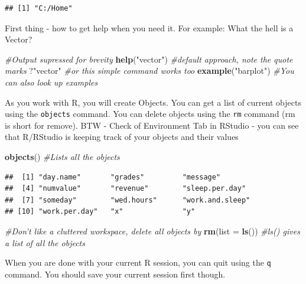 \documentclass[]{krantz}
\makeatletter
\newenvironment{Shaded}{\begin{snugshade}}{\end{snugshade}}
\newcommand{\KeywordTok}[1]{\textcolor[rgb]{0.27,0.27,0.27}{\textbf{#1}}}
\newcommand{\DataTypeTok}[1]{\textcolor[rgb]{0.27,0.27,0.27}{#1}}
\newcommand{\StringTok}[1]{\textcolor[rgb]{0.5,0.5,0.5}{#1}}
\newcommand{\CommentTok}[1]{\textcolor[rgb]{0.37,0.37,0.37}{\textit{#1}}}
\newcommand{\NormalTok}[1]{#1}
\newenvironment{kframe}{%
\medskip{}
\setlength{\fboxsep}{.8em}
 \def\at@end@of@kframe{}%
 \ifinner\ifhmode%
  \def\at@end@of@kframe{\end{minipage}}%
  \begin{minipage}{\columnwidth}%
 \fi\fi%
 \def\FrameCommand##1{\hskip\@totalleftmargin \hskip-\fboxsep
 \colorbox{shadecolor}{##1}\hskip-\fboxsep
     \hskip-\linewidth \hskip-\@totalleftmargin \hskip\columnwidth}%
 \MakeFramed {\advance\hsize-\width
   \@totalleftmargin\z@ \linewidth\hsize
   \@setminipage}}%
 {\par\unskip\endMakeFramed%
 \at@end@of@kframe}
\renewenvironment{Shaded}{\begin{kframe}}{\end{kframe}}
\makeatother
\begin{document}
\begin{verbatim}
## [1] "C:/Home"
\end{verbatim}

First thing - how to get help when you need it. For example: What the
hell is a Vector?

\begin{Shaded}
\begin{Highlighting}[]
\CommentTok{#Output supressed for brevity}
\KeywordTok{help}\NormalTok{(}\StringTok{"vector"}\NormalTok{) }\CommentTok{#default approach, note the quote marks}
\NormalTok{?}\StringTok{"vector"} \CommentTok{#or this simple command works too}
\KeywordTok{example}\NormalTok{(}\StringTok{"barplot"}\NormalTok{) }\CommentTok{#You can also look up examples}
\end{Highlighting}
\end{Shaded}

As you work with R, you will create Objects. You can get a list of
current objects using the \texttt{objects} command. You can delete
objects using the \texttt{rm} command (rm is short for remove). BTW -
Check of Environment Tab in RStudio - you can see that R/RStudio is
keeping track of your objects and their values

\begin{Shaded}
\begin{Highlighting}[]
\KeywordTok{objects}\NormalTok{() }\CommentTok{#Lists all the objects}
\end{Highlighting}
\end{Shaded}

\begin{verbatim}
##  [1] "day.name"       "grades"         "message"       
##  [4] "numvalue"       "revenue"        "sleep.per.day" 
##  [7] "someday"        "wed.hours"      "work.and.sleep"
## [10] "work.per.day"   "x"              "y"
\end{verbatim}

\begin{Shaded}
\begin{Highlighting}[]
\CommentTok{#Don't like a cluttered workspace, delete all objects by}
\KeywordTok{rm}\NormalTok{(}\DataTypeTok{list =} \KeywordTok{ls}\NormalTok{())  }\CommentTok{#ls() gives a list of all the objects}
\end{Highlighting}
\end{Shaded}

When you are done with your current R session, you can quit using the
\texttt{q} command. You should save your current session first though.
\end{document}
